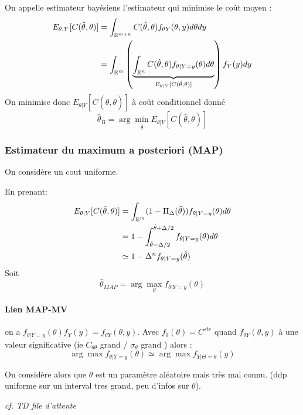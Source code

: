 \documentclass[main.tex]{subfiles}
\begin{document}
\begin{defin}
  On appelle estimateur bayésiens l'estimateur qui minimise le coût moyen :
  \begin{align*}
    E_{\theta,Y}[C(\hat{\theta},\theta)] &= \int_{\mathbb{R}^{m+n}}C(\hat{\theta},\theta)f_{\theta Y}(\theta,y)d\theta dy\\ &=\int_{\mathbb{R}^m}\left(\underbrace{\int_{\mathbb{R}^n}C(\hat{\theta},\theta)f_{\theta|Y=y}(\theta)d\theta}_{E_{\theta|Y}[C(\hat{\theta},\theta)]}\right) f_{Y}(y)dy
  \end{align*}
On minimise donc $ E_{\theta|Y}[C(\hat{\theta},\theta)]$ à coût conditionnel donné
  \[
    \hat{\theta}_{B} = \arg\min_{\hat{\theta}}E_{\theta|Y}[C(\hat{\theta},\theta)]
  \]
\end{defin}

\subsubsection{Estimateur du maximum a posteriori (MAP)}

On considère un cout uniforme.
\begin{defin}
  En prenant:
  \begin{align*}
    E_{\theta|Y}[C(\hat{\theta},\theta)] &= \int_{\mathbb{R}^m}(1-\Pi_{\Delta}(\tilde{\theta}))f_{\theta|Y=y}(\theta)d\theta \\
    &= 1 - \int_{\hat{\theta}-\Delta/2}^{{\hat{\theta}+\Delta/2}}f_{\theta|Y=y}(\theta)d\theta \\
      &\simeq 1- \Delta^nf_{\theta|Y=y}(\hat{\theta})
  \end{align*}
  Soit \[
    \hat{\theta}_{MAP}=\arg\max_{\theta} f_{\theta|Y=y}(\theta)
  \]
\end{defin}

\paragraph{Lien MAP-MV}

on a  $f_{\theta|Y=y}(\theta) f_{Y}(y) = f_{\theta Y}(\theta,y)$. Avec $f_\theta(\theta) = C^{ste}$ quand $f_{\theta Y}(\theta,y)$ à une valeur significative (ie $C_{\theta\theta}$ grand / $\sigma_\theta$  grand ) alors :
 \[
\arg\max f_{\theta|Y=y}(\theta) \simeq \arg\max f_{Y|\Theta=\theta}(y)
 \]

 On considère alors que $\theta$ est un paramètre  aléatoire mais très mal connu. (ddp uniforme sur un interval tres grand, peu d'infos sur $\theta$).

\emph{cf. TD \og file d'attente\fg{}}
\end{document}
